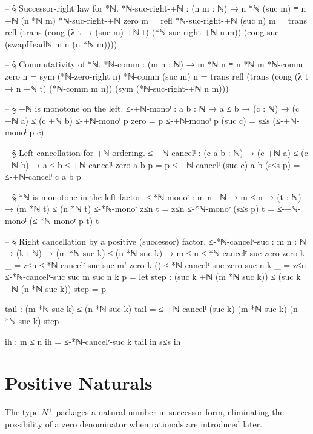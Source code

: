 \documentclass[11pt,a4paper]{book}
\def\mathbb#1{#1}%
\begin{document}
\begin{code}
-- § Successor-right law for *ℕ.
*ℕ-suc-right-+ℕ : (n m : ℕ) → n *ℕ (suc m) ≡ n +ℕ (n *ℕ m)
*ℕ-suc-right-+ℕ zero m = refl
*ℕ-suc-right-+ℕ (suc n) m =
  trans
    refl
    (trans
      (cong (λ t → (suc m) +ℕ t) (*ℕ-suc-right-+ℕ n m))
      (cong suc (swapHeadℕ m n (n *ℕ m))))

-- § Commutativity of *ℕ.
*ℕ-comm : (m n : ℕ) → m *ℕ n ≡ n *ℕ m
*ℕ-comm zero n = sym (*ℕ-zero-right n)
*ℕ-comm (suc m) n =
  trans
    refl
    (trans
      (cong (λ t → n +ℕ t) (*ℕ-comm m n))
      (sym (*ℕ-suc-right-+ℕ n m)))

-- § +ℕ is monotone on the left.
≤-+ℕ-monoˡ : {a b : ℕ} → a ≤ b → (c : ℕ) → (c +ℕ a) ≤ (c +ℕ b)
≤-+ℕ-monoˡ p zero = p
≤-+ℕ-monoˡ p (suc c) = s≤s (≤-+ℕ-monoˡ p c)

-- § Left cancellation for +ℕ ordering.
≤-+ℕ-cancelˡ : (c a b : ℕ) → (c +ℕ a) ≤ (c +ℕ b) → a ≤ b
≤-+ℕ-cancelˡ zero a b p = p
≤-+ℕ-cancelˡ (suc c) a b (s≤s p) = ≤-+ℕ-cancelˡ c a b p

-- § *ℕ is monotone in the left factor.
≤-*ℕ-monoʳ : {m n : ℕ} → m ≤ n → (t : ℕ) → (m *ℕ t) ≤ (n *ℕ t)
≤-*ℕ-monoʳ z≤n t = z≤n
≤-*ℕ-monoʳ (s≤s p) t = ≤-+ℕ-monoˡ (≤-*ℕ-monoʳ p t) t

-- § Right cancellation by a positive (successor) factor.
≤-*ℕ-cancelʳ-suc : {m n : ℕ} → (k : ℕ) → (m *ℕ suc k) ≤ (n *ℕ suc k) → m ≤ n
≤-*ℕ-cancelʳ-suc {zero} {zero} k _ = z≤n
≤-*ℕ-cancelʳ-suc {suc m'} {zero} k ()
≤-*ℕ-cancelʳ-suc {zero} {suc n} k _ = z≤n
≤-*ℕ-cancelʳ-suc {suc m} {suc n} k p =
  let
    step : (suc k +ℕ (m *ℕ suc k)) ≤ (suc k +ℕ (n *ℕ suc k))
    step = p

    tail : (m *ℕ suc k) ≤ (n *ℕ suc k)
    tail = ≤-+ℕ-cancelˡ (suc k) (m *ℕ suc k) (n *ℕ suc k) step

    ih : m ≤ n
    ih = ≤-*ℕ-cancelʳ-suc k tail
  in
  s≤s ih
\end{code}

\section{Positive Naturals}

The type $\mathbb{N}^+$ packages a natural number in successor form, eliminating
the possibility of a zero denominator when rationals are introduced later.
\end{document}
